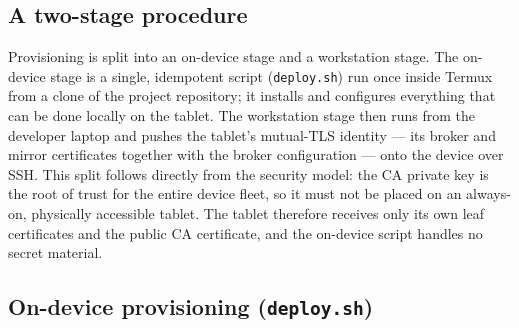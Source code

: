 \subsection{A two-stage procedure}

Provisioning is split into an on-device stage and a workstation stage. The
on-device stage is a single, idempotent script (\texttt{deploy.sh}) run once inside
Termux from a clone of the project repository; it installs and configures
everything that can be done locally on the tablet. The workstation stage then runs
from the developer laptop and pushes the tablet's mutual-TLS identity --- its broker
and mirror certificates together with the broker configuration --- onto the device
over SSH. This split follows directly from the security model: the CA private key
is the root of trust for the entire device fleet, so it must not be placed on an
always-on, physically accessible tablet. The tablet therefore receives only its own
leaf certificates and the public CA certificate, and the on-device script handles
no secret material.

\subsection{On-device provisioning (\texttt{deploy.sh})}


